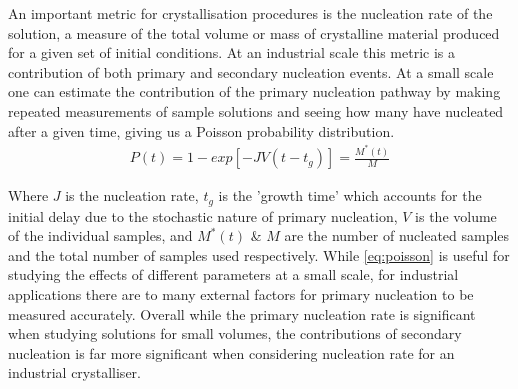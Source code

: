 An important metric for crystallisation procedures is the 
nucleation rate of the solution, a measure of the total 
volume or mass of crystalline material produced for a given 
set of initial conditions. At an industrial scale this 
metric is a contribution of both primary and secondary 
nucleation events. At a small scale one can estimate the 
contribution of the primary nucleation pathway by making 
repeated measurements of sample solutions and seeing how 
many have nucleated after a given time, giving us a Poisson 
probability distribution.
\begin{align}
	P(t) = 1 - exp\left[-JV(t-t_g)\right] = \frac{M^*(t)}{M}
	\label{eq:poisson}
\end{align}

Where $J$ is the nucleation rate, $t_g$ is the 'growth time' 
which accounts for the initial delay due to the stochastic 
nature of primary nucleation, $V$ is the volume of the individual 
samples, and $M^*(t)$ \& $M$ are the number of nucleated samples 
and the total number of samples used respectively. While 
\eqref{eq:poisson} is useful for studying the effects of different 
parameters at a small scale, for industrial applications there are 
to many external factors for primary nucleation to be measured 
accurately. Overall while the primary nucleation rate is significant 
when studying solutions for small volumes, the contributions of 
secondary nucleation is far more significant when considering 
nucleation rate for an industrial crystalliser.

